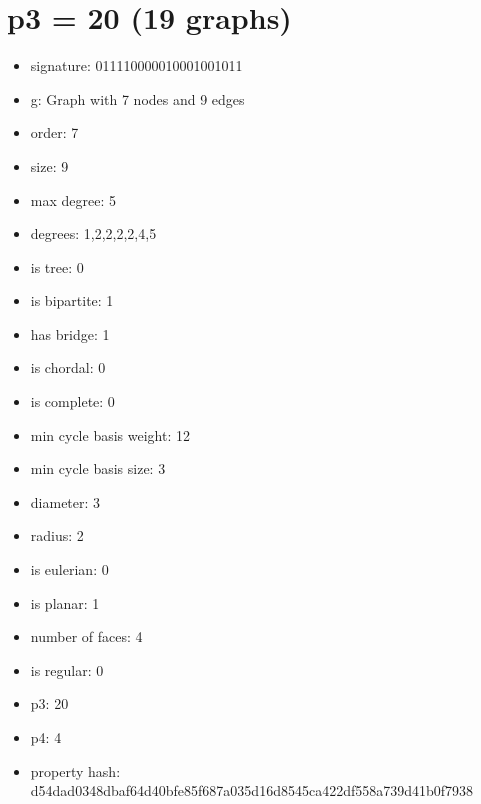 \chapter{p3 = 20 (19 graphs)}
\newpage\begin{figure}
\end{figure}
\begin{itemize}
\item signature: 011110000010001001011
\item g: Graph with 7 nodes and 9 edges
\item order: 7
\item size: 9
\item max degree: 5
\item degrees: 1,2,2,2,2,4,5
\item is tree: 0
\item is bipartite: 1
\item has bridge: 1
\item is chordal: 0
\item is complete: 0
\item min cycle basis weight: 12
\item min cycle basis size: 3
\item diameter: 3
\item radius: 2
\item is eulerian: 0
\item is planar: 1
\item number of faces: 4
\item is regular: 0
\item p3: 20
\item p4: 4
\item property hash: d54dad0348dbaf64d40bfe85f687a035d16d8545ca422df558a739d41b0f7938
\end{itemize}
\newpage
